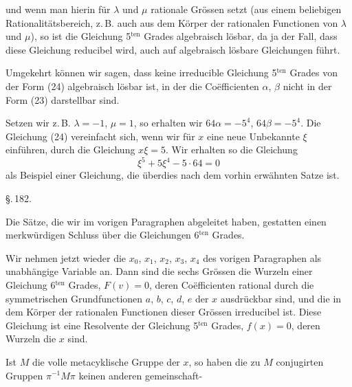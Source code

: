
und wenn man hierin f\"ur $\lambda$ und $\mu$ rationale Gr\"ossen setzt (aus
einem beliebigen Rationalit\"atsbereich, z.\,B. auch aus dem K\"orper
der rationalen Functionen von $\lambda$ und $\mu$), so ist die Gleichung
5$^{\text{ten}}$ Grades
algebraisch l\"osbar, da ja der Fall, dass diese Gleichung reducibel
 wird, auch auf algebraisch l\"osbare Gleichungen f\"uhrt.

Umgekehrt k\"onnen wir sagen, dass keine irreducible Gleichung
 5$^{\text{ten}}$ Grades von der Form (24) algebraisch l\"osbar ist, in
der die Co\"efficienten $\alpha$, $\beta$ nicht in der Form (23) darstellbar sind.

Setzen wir z.\,B. $\lambda=-1$, $\mu=1$, so erhalten wir $64\alpha=-5^4$,
$64\beta=-5^4$. Die Gleichung (24) vereinfacht sich, wenn wir f\"ur
$x$ eine neue Unbekannte $\xi$ einf\"uhren, durch die Gleichung $x\xi=5$.
Wir erhalten so die Gleichung
\[
\xi^5+5\xi^4-5\cdot 64=0
\]
als Beispiel einer  Gleichung, die \"uberdies
 nach dem vorhin erw\"ahnten Satze  ist.

\begin{center}
\S.\,182.

\end{center}

Die S\"atze, die wir im vorigen Paragraphen abgeleitet haben,
gestatten einen merkw\"urdigen Schluss \"uber die Gleichungen
6$^{\text{ten}}$ Grades.

Wir nehmen jetzt wieder die $x_0$, $x_1$, $x_2$, $x_3$, $x_4$ des vorigen
Paragraphen als unabh\"angige Variable an. Dann sind die sechs
Gr\"ossen
die Wurzeln einer Gleichung 6$^{\text{ten}}$ Grades, $F(v)=0$, deren
Co\"efficienten rational durch die symmetrischen Grundfunctionen
$a$, $b$, $c$, $d$, $e$ der $x$ ausdr\"uckbar sind, und die in dem K\"orper
der rationalen Functionen dieser Gr\"ossen irreducibel ist. Diese
Gleichung ist eine Resolvente der Gleichung 5$^{\text{ten}}$ Grades, $f(x)=0$,
deren Wurzeln die $x$ sind.

Ist $M$ die volle metacyklische Gruppe der $x$, so haben die
zu $M$ conjugirten Gruppen $\pi^{-1}M\pi$ keinen anderen gemeinschaft-
